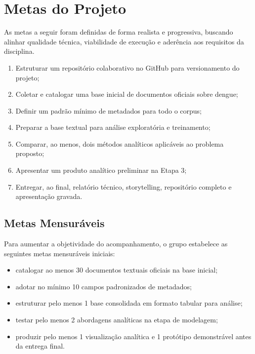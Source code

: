 \documentclass[12pt,a4paper]{article}
\begin{document}
\clearpage
\section{Metas do Projeto}

As metas a seguir foram definidas de forma realista e progressiva, buscando alinhar qualidade técnica, viabilidade de execução e aderência aos requisitos da disciplina.

\begin{enumerate}[leftmargin=1.2cm]
    \item Estruturar um repositório colaborativo no GitHub para versionamento do projeto;
    \item Coletar e catalogar uma base inicial de documentos oficiais sobre dengue;
    \item Definir um padrão mínimo de metadados para todo o corpus;
    \item Preparar a base textual para análise exploratória e treinamento;
    \item Comparar, ao menos, dois métodos analíticos aplicáveis ao problema proposto;
    \item Apresentar um produto analítico preliminar na Etapa 3;
    \item Entregar, ao final, relatório técnico, storytelling, repositório completo e apresentação gravada.
\end{enumerate}

\subsection{Metas Mensuráveis}

Para aumentar a objetividade do acompanhamento, o grupo estabelece as seguintes metas mensuráveis iniciais:

\begin{itemize}[leftmargin=1.2cm]
    \item catalogar ao menos 30 documentos textuais oficiais na base inicial;
    \item adotar no mínimo 10 campos padronizados de metadados;
    \item estruturar pelo menos 1 base consolidada em formato tabular para análise;
    \item testar pelo menos 2 abordagens analíticas na etapa de modelagem;
    \item produzir pelo menos 1 visualização analítica e 1 protótipo demonstrável antes da entrega final.
\end{itemize}
\end{document}

